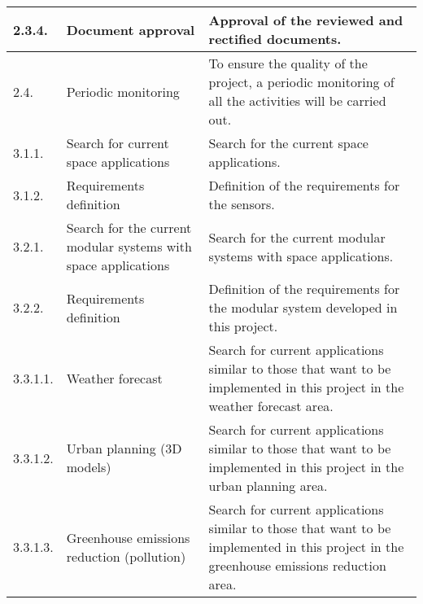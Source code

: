 \begin{longtable}[H]{l >{\raggedright\arraybackslash}p{4cm} p{8cm}}
	\midrule
	
	2.3.4. & Document approval & Approval of the reviewed and rectified documents.\vspace{0.2cm} \\
	
	\midrule
	
	2.4. & Periodic monitoring & To ensure the quality of the project, a periodic monitoring of all the activities will be carried out.\vspace{0.2cm} \\
	
	\midrule
	
	3.1.1. & Search for current space applications & Search for the current space applications.\vspace{0.2cm} \\
	
	\midrule
	
	3.1.2. & Requirements definition & Definition of the requirements for the sensors.\vspace{0.2cm} \\

	\midrule
	
	3.2.1. & Search for the current modular systems with space applications & Search for the current modular systems with space applications.\vspace{0.2cm} \\
	
	\midrule
	
	3.2.2. & Requirements definition & Definition of the requirements for the modular system developed in this project.\vspace{0.2cm} \\
	
	\midrule
	
	3.3.1.1. & Weather forecast & Search for current applications similar to those that want to be implemented in this project in the weather forecast area.\vspace{0.2cm} \\
	
	\midrule
	
	3.3.1.2. & Urban planning (3D models) & Search for current applications similar to those that want to be implemented in this project in the urban planning area.\vspace{0.2cm} \\
	
	\midrule
	
	3.3.1.3. & Greenhouse emissions reduction (pollution) & Search for current applications similar to those that want to be implemented in this project in the greenhouse emissions reduction area.\vspace{0.2cm} \\
	

\end{longtable}
